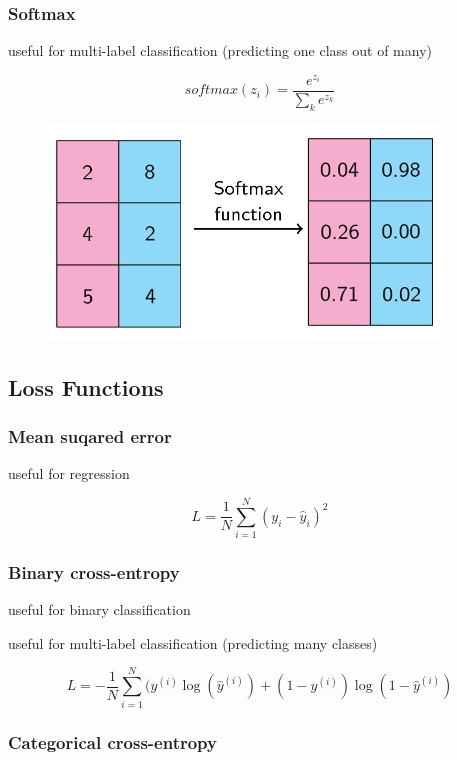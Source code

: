 \documentclass[11pt]{article}
\begin{document}
\subsubsection{Softmax}

useful for multi-label classification (predicting one class out of many)

\begin{equation}
    softmax(z_i) = \frac{e^{z_i}}{\sum_k e^{z_k}}
\end{equation}

\begin{figure}[H]
    \centering
    \includegraphics*[width=.3\linewidth]{images/softmax.png}
\end{figure}

\subsection{Loss Functions}

\subsubsection{Mean suqared error}

useful for regression

\begin{equation}
    L = \frac{1}{N} \sum^N_{i=1} (y_i- \hat{y} _i )^2
\end{equation}

\subsubsection{Binary cross-entropy}

useful for binary classification

useful for multi-label classification (predicting many classes)

\begin{equation}
    L = -\frac{1}{N} \sum^N_{i=1} (y^{(i)}\log(\hat{y}^{(i)})+(1-y^{(i)})\log(1-\hat{y}^{(i)})
\end{equation}

\subsubsection{Categorical cross-entropy}
\end{document}

